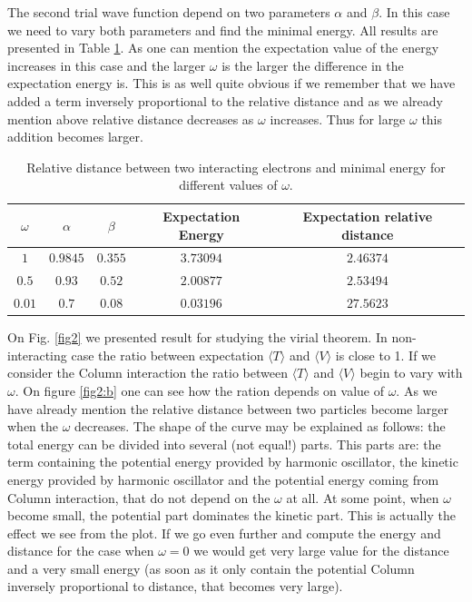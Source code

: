 \documentclass[10pt]{article}
\begin{document}
The second trial wave function depend on two parameters $\alpha$ and $\beta$. In this case we need to vary both parameters and find the minimal energy. All results are presented in Table \ref{tab:two}. As one can mention the expectation value of the energy increases in this case and the larger $\omega$ is the larger the difference in the expectation energy is. This is as well quite obvious if we remember that we have added a term inversely proportional to the relative distance and as we already mention above relative distance decreases as $\omega$ increases. Thus for large $\omega$ this addition becomes larger.
 
\begin{table}[h!]
  \caption{Relative distance between two interacting electrons and minimal energy for different values of $\omega$.}
  \label{tab:two}
  \begin{center}
    \begin{tabular}{c|c|c|c|c}
    \hline
		$\omega$ & $\alpha$& $\beta$ & Expectation Energy & Expectation relative distance \\
    \hline
	$	1 $  & $0.9845$& $0.355$ & $3.73094$ & $2.46374$  \\
	$	0.5$  & $0.93$ & $0.52$ & $2.00877$ & $2.53494$   \\
	$	0.01$  & $0.7$ & $0.08$ & $0.03196$ & $27.5623$   \\
	\end{tabular}
  \end{center}
\end{table}


On Fig. \ref{fig2} we presented result for studying the virial theorem. In non-interacting case the ratio between expectation  $\langle T \rangle$  and   $\langle V \rangle$ is close to 1. If we consider the Column interaction the ratio between  $\langle T \rangle$  and   $\langle V \rangle$ begin to vary with $\omega$. On figure \ref{fig2:b} one can see how the ration depends on value of $\omega$. As we have already mention the relative distance between two particles become larger when the $\omega$ decreases. The shape of the curve may be explained as follows: the total energy can be divided into several (not equal!) parts. This parts are: the term containing the potential energy provided by harmonic oscillator, the kinetic energy provided by harmonic oscillator and the potential energy coming from Column interaction, that do not depend on the $\omega$ at all. At some point, when $\omega$ become small, the potential part dominates the kinetic part. This is actually the effect we see from the plot. If we go even further and compute the energy and distance for the case when $\omega =0$ we would get very large value for the distance and a very small energy (as soon as it only contain the potential Column inversely proportional to distance, that becomes very large).
\end{document}
